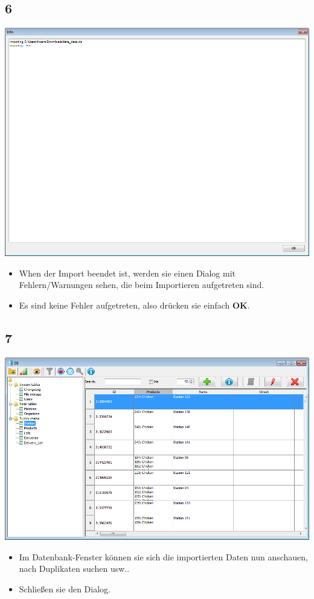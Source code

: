 \documentclass{beamer}
\begin{document}
\subsection{6}
\begin{frame}
	\begin{center}
  		\includegraphics[height=0.6\textheight]{6.png}
	\end{center}
	\begin{itemize}
		\item When der Import beendet ist, werden sie einen Dialog mit Fehlern/Warnungen sehen, die beim Importieren aufgetreten sind.
		\item Es sind keine Fehler aufgetreten, also drücken sie einfach \textbf{OK}.
	\end{itemize}
\end{frame}

\subsection{7}
\begin{frame}
	\begin{center}
  		\includegraphics[height=0.6\textheight]{7.png}
	\end{center}
	\begin{itemize}
		\item Im Datenbank-Fenster können sie sich die importierten Daten nun anschauen, nach Duplikaten suchen usw..
		\item Schließen sie den Dialog.
	\end{itemize}
\end{frame}
\end{document}
